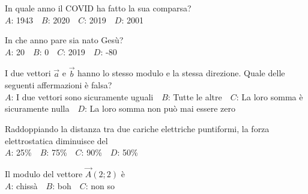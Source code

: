 \mcquestionheader In quale anno il COVID ha fatto la sua comparsa?\\
{$A$}: 1943\ \ {$B$}: 2020\ \ {$C$}: 2019\ \ {$D$}: 2001\ \ 

\mcquestionfooter



\def\mcquestionnumber{5}


\mcquestionheader In che anno pare sia nato Gesù?\\
{$A$}: 20\ \ {$B$}: 0\ \ {$C$}: 2019\ \ {$D$}: -80\ \ 

\mcquestionfooter



\def\mcquestionnumber{6}


\mcquestionheader I due vettori $\vec{a}$ e $\vec{b}$ hanno lo stesso modulo e la stessa direzione. Quale delle seguenti affermazioni è falsa?\\
{$A$}: I due vettori sono sicuramente uguali\ \ {$B$}: Tutte le altre\ \ {$C$}: La loro somma è sicuramente nulla\ \ {$D$}: La loro somma non può mai essere zero\ \ 

\mcquestionfooter



\def\mcquestionnumber{7}


\mcquestionheader Raddoppiando la distanza tra due cariche elettriche puntiformi, la forza elettrostatica diminuisce del\\
{$A$}: 25\%\ \ {$B$}: 75\%\ \ {$C$}: 90\%\ \ {$D$}: 50\%\ \ 

\mcquestionfooter



\def\mcquestionnumber{8}


\mcquestionheader Il modulo del vettore $\vec{A}(2;2)$ è\\
{$A$}: chissà\ \ {$B$}: boh\ \ {$C$}: non so\ \ 

\mcquestionfooter



\def\mcquestionnumber{9}


